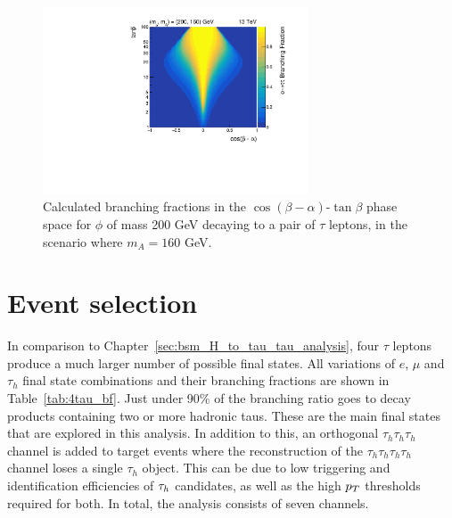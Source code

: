 \begin{figure}[!hbtp]
\centering
    \includegraphics[width=0.7\textwidth]{Figures/phi_branching_fractions_mphi200_mA160.pdf}
\caption[Plot of the branching fractions of $\phi$ to pairs of $\tau$ leptons out of the alignment scenario.]{Calculated branching fractions in the $\cos(\beta-\alpha)$-$\tan\beta$ phase space for $\phi$ of mass 200 GeV decaying to a pair of $\tau$ leptons, in the scenario where $m_A = 160$ GeV.}
\label{fig:4tau_br_2d}
\end{figure}

\section{Event selection}

In comparison to Chapter~\ref{sec:bsm_H_to_tau_tau_analysis}, four $\tau$ leptons produce a much larger number of possible final states. 
All variations of $e$, $\mu$ and $\tau_h$ final state combinations and their branching fractions are shown in Table~\ref{tab:4tau_bf}.
Just under 90\% of the branching ratio goes to decay products containing two or more hadronic taus.
These are the main final states that are explored in this analysis. 
In addition to this, an orthogonal $\tau_h \tau_h \tau_h$ channel is added to target events where the reconstruction of the $\tau_h \tau_h \tau_h \tau_h$ channel loses a single $\tau_h$ object.
This can be due to low triggering and identification efficiencies of $\tau_{h}$ candidates, as well as the high $p_{T}$ thresholds required for both.
In total, the analysis consists of seven channels. \\

